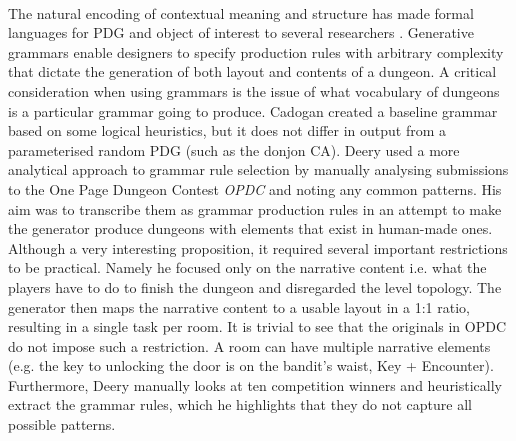 \documentclass{UoYCSproject}
\begin{document}
\paragraph{}
The natural encoding of contextual meaning and structure has made formal languages for PDG and object of interest to several researchers \parencite{DormansMS,Cadogan,Deery}. Generative grammars enable designers to specify production rules with arbitrary complexity that dictate the generation of both layout and contents of a dungeon. A critical consideration when using grammars is the issue of what vocabulary of dungeons is a particular grammar going to produce. Cadogan \parencite{Cadogan} created a baseline grammar based on some logical heuristics, but it does not differ in output from a parameterised random PDG (such as the donjon CA). Deery used a more analytical approach to grammar rule selection by manually analysing submissions to the One Page Dungeon Contest \textit{OPDC} \parencite{OPDC} and noting any common patterns. His aim was to transcribe them as grammar production rules in an attempt to make the generator produce dungeons with elements that exist in human-made ones. Although a very interesting proposition, it required several important restrictions to be practical. Namely he focused only on the narrative content i.e. what the players have to do to finish the dungeon and disregarded the level topology. The generator then maps the narrative content to a usable layout in a 1:1 ratio, resulting in a single task per room. It is trivial to see that the originals in OPDC do not impose such a restriction. A room can have multiple narrative elements (e.g. the key to unlocking the door is on the bandit’s waist, Key + Encounter). Furthermore, Deery manually looks at ten competition winners and heuristically extract the grammar rules, which he highlights that they do not capture all possible patterns.

\end{document}
